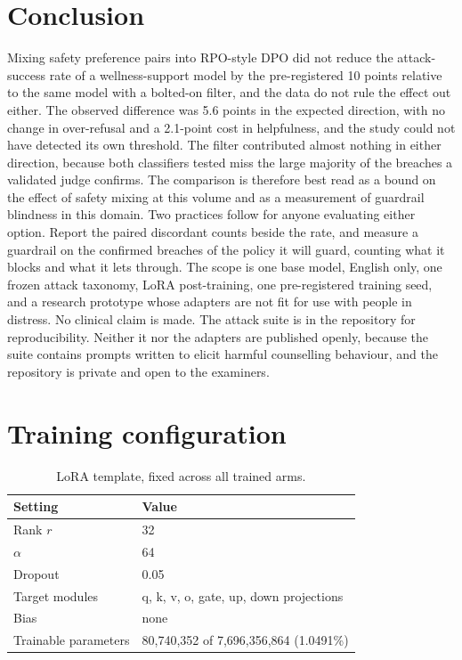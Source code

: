 \documentclass[10pt]{article} %
\begin{document}
\section{Conclusion}
\label{sec:conclusion}
Mixing safety preference pairs into RPO-style DPO did not reduce the attack-success rate of a wellness-support model by the pre-registered 10 points relative to the same model with a bolted-on filter, and the data do not rule the effect out either. The observed difference was 5.6 points in the expected direction, with no change in over-refusal and a 2.1-point cost in helpfulness, and the study could not have detected its own threshold. The filter contributed almost nothing in either direction, because both classifiers tested miss the large majority of the breaches a validated judge confirms. The comparison is therefore best read as a bound on the effect of safety mixing at this volume and as a measurement of guardrail blindness in this domain. Two practices follow for anyone evaluating either option. Report the paired discordant counts beside the rate, and measure a guardrail on the confirmed breaches of the policy it will guard, counting what it blocks and what it lets through. The scope is one base model, English only, one frozen attack taxonomy, LoRA post-training, one pre-registered training seed, and a research prototype whose adapters are not fit for use with people in distress. No clinical claim is made. The attack suite is in the repository for reproducibility. Neither it nor the adapters are published openly, because the suite contains prompts written to elicit harmful counselling behaviour, and the repository is private and open to the examiners.




\appendix
\section{Training configuration}
\label{app:config}

\begin{table}[H]
\caption{LoRA template, fixed across all trained arms.}
\label{tab:lora}
\begin{center}
\begin{tabular}{ll}
\toprule
Setting & Value \\
\midrule
Rank $r$ & 32 \\
$\alpha$ & 64 \\
Dropout & 0.05 \\
Target modules & q, k, v, o, gate, up, down projections \\
Bias & none \\
Trainable parameters & 80,740,352 of 7,696,356,864 (1.0491\%) \\
\bottomrule
\end{tabular}
\end{center}
\end{table}
\end{document}
